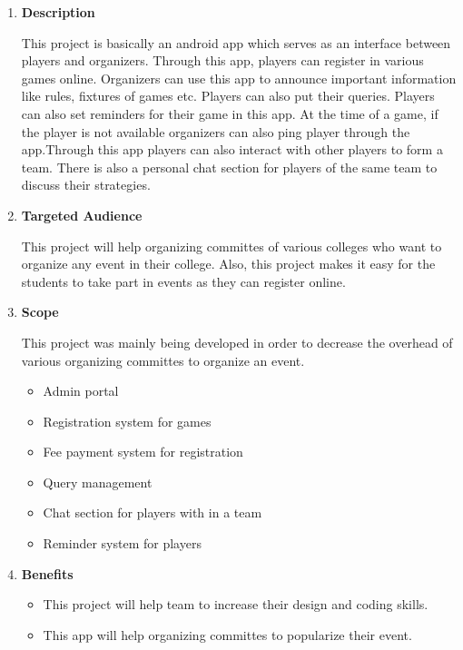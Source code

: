 \documentclass[fleqn,10pt]{../SelfArx} %
\begin{document}
\vspace{0.5cm}
\begin{enumerate}
\item \textbf{Description}

This project is basically an android app which serves as an interface between players and organizers. Through this app, players can register in various games online. Organizers can use this app to announce important information like rules, fixtures of games etc. Players can also put their queries. Players can also set reminders for their game in this app. At the time of a game, if the player is not available organizers can also ping player through the app.Through this app players can also interact with other players to form a team. There is also a personal chat section for players of the same team to discuss their strategies.

\item \textbf{ Targeted Audience}

This project will help organizing committes of various colleges who want to organize any event in their college. Also, this project makes it easy for the students to take part in events as they can register online.

\item \textbf{Scope}

This project was mainly being developed in order to decrease the overhead of various organizing committes to organize an event.

\begin{itemize}
    \item   Admin portal
 \item  Registration system for games
 \item  Fee payment system for registration
 \item  Query management
 \item  Chat section for players with in a team
 \item  Reminder system for players
\end{itemize}


\item \textbf{Benefits}

\begin{itemize}
    \item   This project will help team to increase their design and coding skills.
    \item   This app will help organizing committes to popularize their event.
  
\end{itemize}


\end{enumerate}
\end{document}
